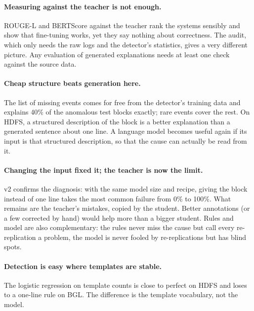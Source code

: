 \documentclass[11pt,a4paper]{article}
\begin{document}
\paragraph{Measuring against the teacher is not enough.} ROUGE-L and BERTScore against the
teacher rank the systems sensibly and show that fine-tuning works, yet they say nothing about
correctness. The audit, which only needs the raw logs and the detector's statistics, gives a
very different picture. Any evaluation of generated explanations needs at least one check
against the source data.

\paragraph{Cheap structure beats generation here.} The list of missing events comes for free
from the detector's training data and explains 40\% of the anomalous test blocks exactly; rare
events cover the rest. On HDFS, a structured description of the block is a better explanation
than a generated sentence about one line. A language model becomes useful again if its input
is that structured description, so that the cause can actually be read from it.

\paragraph{Changing the input fixed it; the teacher is now the limit.} v2 confirms the
diagnosis: with the same model size and recipe, giving the block instead of one line takes the
most common failure from 0\% to 100\%. What remains are the teacher's mistakes, copied by the
student. Better annotations (or a few corrected by hand) would help more than a bigger
student. Rules and model are also complementary: the rules never miss the cause but call every
re-replication a problem, the model is never fooled by re-replications but has blind spots.

\paragraph{Detection is easy where templates are stable.} The logistic regression on template
counts is close to perfect on HDFS and loses to a one-line rule on BGL. The difference is the
template vocabulary, not the model.
\end{document}

